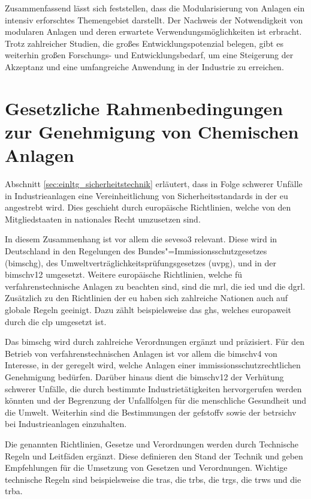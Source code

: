 Zusammenfassend l\"asst sich feststellen, dass die Modularisierung von Anlagen ein intensiv erforschtes Themengebiet darstellt. Der Nachweis der Notwendigkeit von modularen Anlagen und deren erwartete Verwendungsm\"oglichkeiten ist erbracht. Trotz zahlreicher Studien, die gro\ss{}es Entwicklungspotenzial belegen, gibt es weiterhin gro\ss{}en Forschungs- und Entwicklungsbedarf, um eine Steigerung der Akzeptanz und eine umfangreiche Anwendung in der Industrie zu erreichen.

\section{Gesetzliche Rahmenbedingungen zur Genehmigung von Chemischen Anlagen}
Abschnitt \ref{sec:einltg_sicherheitstechnik} erl\"autert, dass in Folge schwerer Unf\"alle in Industrieanlagen eine Vereinheitlichung von Sicherheitsstandards in der \ac{eu} angestrebt wird. Dies geschieht durch europ\"aische Richtlinien, welche von den Mitgliedstaaten in nationales Recht umzusetzen sind.

In diesem Zusammenhang ist vor allem die \ac{seveso3} relevant. Diese wird in Deutschland in den Regelungen des Bundes"=Immissionsschutzgesetzes (\ac{bimschg}), des Umweltvertr\"aglichkeitspr\"ufungsgesetzes (\ac{uvpg}), und in der \acf{bimschv12} umgesetzt. Weitere europ\"aische Richtlinien, welche f\"u verfahrenstechnische Anlagen zu beachten sind, sind die \ac{mrl}, die \ac{ied} und die \ac{dgrl}. \newline
Zus\"atzlich zu den Richtlinien der \ac{eu} haben sich zahlreiche Nationen auch auf globale Regeln geeinigt. Dazu z\"ahlt beispielsweise das \ac{ghs}, welches europaweit durch die \ac{clp} umgesetzt ist.

Das \ac{bimschg} wird durch zahlreiche Verordnungen erg\"anzt und pr\"azisiert. \newline
F\"ur den Betrieb von verfahrenstechnischen Anlagen ist vor allem die \ac{bimschv4} von Interesse, in der geregelt wird, welche Anlagen einer immissionsschutzrechtlichen Genehmigung bed\"urfen. \newline
Dar\"uber hinaus dient die \ac{bimschv12} der Verh\"utung schwerer Unf\"alle, die durch bestimmte Industriet\"atigkeiten hervorgerufen werden k\"onnten und der Begrenzung der Unfallfolgen für die menschliche Gesundheit und die Umwelt. Weiterhin sind die Bestimmungen der \ac{gefstoffv} sowie der \ac{betrsichv} bei Industrieanlagen einzuhalten.

Die genannten Richtlinien, Gesetze und Verordnungen werden durch Technische Regeln und Leitf\"aden erg\"anzt. Diese definieren den Stand der Technik und geben Empfehlungen f\"ur die Umsetzung von Gesetzen und Verordnungen. Wichtige technische Regeln sind beispielsweise die \ac{tras}, die \ac{trbs}, die \ac{trgs}, die \ac{trws} und die \ac{trba}.

